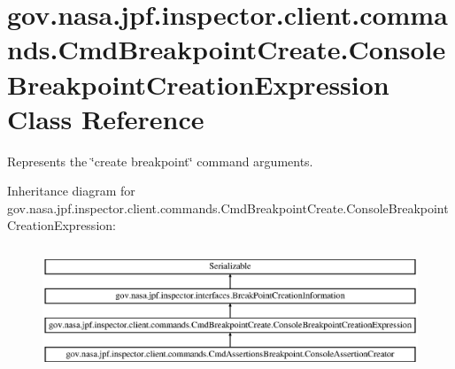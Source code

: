\hypertarget{classgov_1_1nasa_1_1jpf_1_1inspector_1_1client_1_1commands_1_1_cmd_breakpoint_create_1_1_console_breakpoint_creation_expression}{}\section{gov.\+nasa.\+jpf.\+inspector.\+client.\+commands.\+Cmd\+Breakpoint\+Create.\+Console\+Breakpoint\+Creation\+Expression Class Reference}
\label{classgov_1_1nasa_1_1jpf_1_1inspector_1_1client_1_1commands_1_1_cmd_breakpoint_create_1_1_console_breakpoint_creation_expression}


Represents the \char`\"{}create breakpoint\char`\"{} command arguments.  


Inheritance diagram for gov.\+nasa.\+jpf.\+inspector.\+client.\+commands.\+Cmd\+Breakpoint\+Create.\+Console\+Breakpoint\+Creation\+Expression\+:\begin{figure}[H]
\begin{center}
\leavevmode
\includegraphics[height=3.796610cm]{classgov_1_1nasa_1_1jpf_1_1inspector_1_1client_1_1commands_1_1_cmd_breakpoint_create_1_1_console_breakpoint_creation_expression}
\end{center}
\end{figure}
